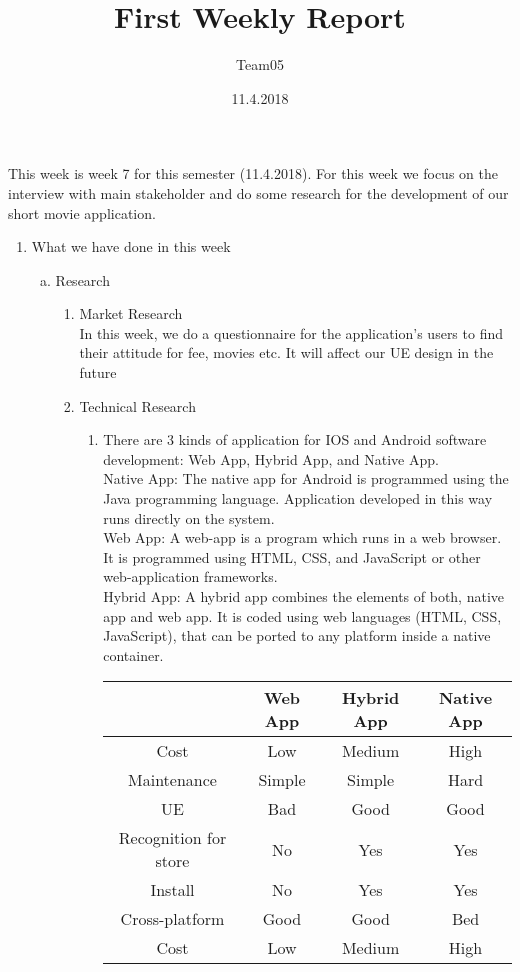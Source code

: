 \documentclass[12pt, letterpaper]{article}
\title{First Weekly Report}
\author{Team05}
\date{11.4.2018}
\begin{document}
\begin{titlepage}
\maketitle
\end{titlepage}

This week is week 7 for this semester (11.4.2018). For this week we focus on the interview with main stakeholder and do some research for the development of our short movie application.

\begin{enumerate}[1]
	\item What we have done in this week
		\begin{enumerate} [(a)]
			\item Research
				\begin{enumerate}[i]
					\item Market Research\\
					In this week, we do a questionnaire for the application’s users to find their attitude for fee, movies etc. It will affect our UE design in the future
					\item Technical Research\\
						\begin{enumerate}[1]	
							\item There are 3 kinds of application for IOS and Android software development: Web App, Hybrid App, and Native App.	\\

Native App: The native app for Android is programmed using the Java programming language. Application developed in this way runs directly on the system.\cite{viswanathan2014pros}\\

Web App: A web-app is a program which runs in a web browser. It is programmed using HTML, CSS, and JavaScript or other web-application frameworks.\cite{serrano2013mobile}\\

Hybrid App: A hybrid app combines the elements of both, native app and web app. It is coded using web languages (HTML, CSS, JavaScript), that can be ported to any platform inside a native container.\cite{serrano2013mobile}\\
						\begin{tabular}{|c|c|c|c|}
						\hline
						 &Web App&Hybrid App&Native App\\
						\hline
						Cost&Low&Medium&High\\
						\hline
						Maintenance&Simple&Simple&Hard\\
						\hline
						UE&Bad&Good&Good\\
						\hline
						Recognition for store&No&Yes&Yes\\
						\hline
						Install&No&Yes&Yes\\
						\hline
						Cross-platform&Good&Good&Bed\\
						\hline
						Cost&Low&Medium&High\\
						\hline
						\end{tabular}


\end{enumerate}
\end{enumerate}
\end{enumerate}
\end{enumerate}
\end{document}
